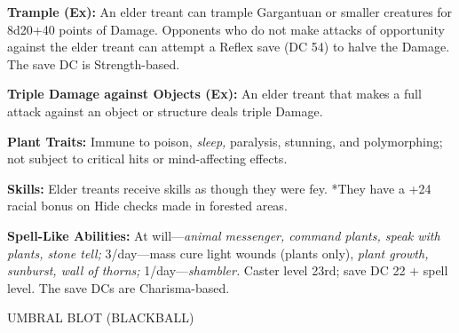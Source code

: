 \documentclass{article}
\begin{document}
{\textbf{Trample (Ex): }An elder treant can trample Gargantuan or smaller creatures 
for 8d20+40 points of Damage. Opponents who do not make attacks of opportunity 
against the elder treant can attempt a Reflex save (DC 54) to halve the Damage. 
The save DC is Strength-based.

\textbf{Triple Damage against Objects (Ex): }An elder treant that makes a full 
attack against an object or structure deals triple Damage. 

\textbf{Plant Traits:} Immune to poison, \textit{sleep, }paralysis, stunning, and 
polymorphing; not subject to critical hits or mind-affecting effects. 

\textbf{Skills: }Elder treants receive skills as though they were fey. *They have 
a +24 racial bonus on Hide checks made in forested areas. 

\textbf{Spell-Like Abilities: }At will---\textit{animal messenger, command plants, 
speak with plants, stone tell; }3/day---mass cure light wounds\textit{ }(plants 
only), \textit{plant growth, sunburst, wall of thorns; }1/day---\textit{shambler. 
}Caster level 23rd; save DC 22 + spell level. The save DCs are Charisma-based.

\vspace{12pt}
{\LARGE{}UMBRAL BLOT (BLACKBALL) }

}
\end{document}

